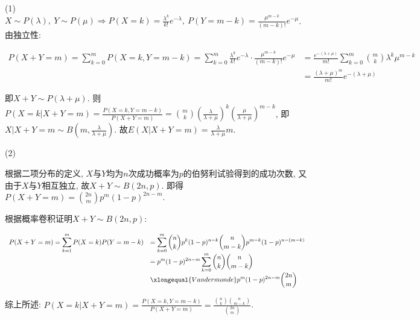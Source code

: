 \documentclass[standard]{ExBook}
\begin{document}
\begin{qitems}
\begin{bbox}
(1) $\displaystyle X\sim P(\lambda),\ Y\sim P(\mu) \Longrightarrow P(X=k)=\frac{\lambda^k}{k!}e^{-\lambda},\ P(Y=m-k)=\frac{\mu^{m-k}}{(m-k)!}e^{-\mu}$. 由独立性:
\vspace{-2em}
\begin{center}
\begin{equation}
    \begin{array}{ll}
        \nonumber
\displaystyle P(X+Y=m)=\sum\limits_{k=0}^{m}P(X=k,Y=m-k)=\sum\limits_{k=0}^{m}\frac{\lambda^k}{k!}e^{-\lambda}\cdot\frac{\mu^{m-k}}{(m-k)!}e^{-\mu} & =\displaystyle\frac{e^{-(\lambda+\mu)}}{m!}\sum\limits_{k=0}^{m}\binom{m}{k}\lambda^k \mu^{m-k}\\
& =\displaystyle\frac{(\lambda+\mu)^m}{m!}e^{-(\lambda+\mu)}
    \end{array}
\end{equation}
\end{center}
即$X+Y\sim P(\lambda+\mu)$. 则$P(X = k|X + Y = m)=\displaystyle\frac{P(X=k,Y=m-k)}{P(X+Y=m)}=\binom{m}{k}\left(\frac{\lambda}{\lambda+\mu}\right)^{k}\left(\frac{\mu}{\lambda+\mu}\right)^{m-k}$, 即$X|X+Y=m\sim B(m,\displaystyle\frac{\lambda}{\lambda+\mu})$. 故$E(X|X+Y=m)=\displaystyle\frac{\lambda}{\lambda+\mu}m$.
    \end{bbox}

\vspace{-5em}

    \begin{bbox}
(2)

 根据二项分布的定义, $X$与$Y$均为$n$次成功概率为$p$的伯努利试验得到的成功次数, 又由于$X$与$Y$相互独立, 故$X+Y\sim B(2n,p)$. 即得$P(X+Y=m)=\displaystyle\binom{2n}{m}p^m(1-p)^{2n-m}$.

 根据概率卷积证明$X+Y\sim B(2n,p)$:
\vspace{-2em}
\begin{center}
\begin{equation}
    \begin{array}{ll}
        \nonumber
P(X+Y=m)=\displaystyle\sum\limits_{k=1}^{m}P(X=k)P(Y=m-k) & =\displaystyle\sum\limits_{k=0}^{m}\binom{n}{k}p^{k}(1-p)^{n-k}\binom{n}{m-k}p^{m-k}(1-p)^{n-(m-k)}\\
& =\displaystyle p^{m}(1-p)^{2n-m}\sum\limits_{k=0}^{m}\binom{n}{k}\binom{n}{m-k}\\
& \xlongequal{Vandermonde} \displaystyle p^{m}(1-p)^{2n-m}\binom{2n}{m}
    \end{array}
\end{equation}
\end{center}
综上所述: $\displaystyle P(X=k|X+Y=m)=\frac{P(X=k,Y=m-k)}{P(X+Y=m)}=\frac{\binom{n}{k}\binom{n}{m-k}}{\binom{2n}{m}}$.


\end{bbox}
\end{qitems}
\end{document}
